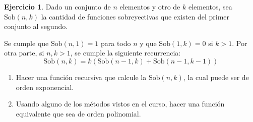 \documentclass[a4paper,12pt]{book}
\newcommand{\te}{\text}
\theoremstyle{definition}
\newtheorem{ejercicio}{Ejercicio}
\begin{document}
	\begin{ejercicio}
		Dado un conjunto de $n$ elementos y otro de $k$ elementos, sea $\te{Sob}(n,k)$ la cantidad de funciones sobreyectivas que existen del primer conjunto al segundo.
		
		Se cumple que $\te{Sob}(n,1)=1$ para todo $n$ y que $\te{Sob}(1,k)=0$ si $k>1$. Por otra parte, si $n,k>1$, se cumple la siguiente recurrencia:
		$$\te{Sob}(n,k) = k(\te{Sob}(n-1,k) + \te{Sob}(n-1,k-1))
		$$
		\begin{enumerate}\parskip-.5ex
			\item Hacer una función recursiva que calcule la $\te{Sob}(n,k)$, la cual puede ser de orden exponencial.
			\item Usando alguno de los métodos vistos en el curso, hacer una función equivalente que sea de orden polinomial.
		\end{enumerate}
	\end{ejercicio}
	
\end{document}
